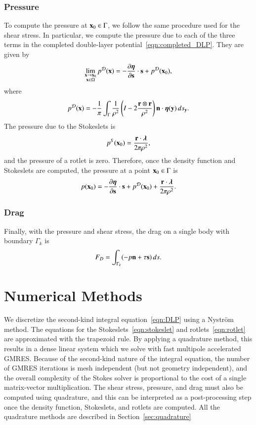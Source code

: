 \documentclass[preprint, 10pt]{elsarticle}
\begin{document}
\subsubsection{Pressure}
To compute the pressure at ${\mathbf{x}}_0 \in \Gamma$, we follow the same
procedure used for the shear stress.  In particular, we compute the
pressure due to each of the three terms in the completed double-layer
potential~\eqref{eqn:completed_DLP}.  They are given by
\begin{align*}
  \lim_{\substack{{\mathbf{x}} \rightarrow {\mathbf{x}}_0 \\ {\mathbf{x}} \in \Omega}}p^{\mathcal{D}}({\mathbf{x}}) =  
  -\frac{\partial {\boldsymbol\eta}}{\partial {\mathbf{s}}} \cdot {\mathbf{s}} + p^{{\mathcal{D}}}({\mathbf{x}}_0),
\end{align*}
where
\begin{align*}
  p^{\mathcal{D}}({\mathbf{x}}) = -\frac{1}{\pi}\int_{\Gamma} \frac{1}{\rho^2}
    \left(I - 2 \frac{{\mathbf{r}} \otimes {\mathbf{r}}}{\rho^2}\right) 
    {\mathbf{n}} \cdot {\boldsymbol\eta}({\mathbf{y}}) \,ds_{\mathbf{y}}.
\end{align*}
The pressure due to the Stokeslets is
\begin{align}
  p^S({\mathbf{x}}_0) = \frac{{\mathbf{r}} \cdot {\boldsymbol\lambda}}{2\pi\rho^2},
  \label{eqn:pressureDLP}
\end{align}
and the pressure of a rotlet is zero.  Therefore, once the density
function and Stokeslets are computed, the pressure at a point ${\mathbf{x}}_0 \in
\Gamma$ is
\begin{align*}
  p({\mathbf{x}}_0) = -\frac{\partial {\boldsymbol\eta}}{\partial {\mathbf{s}}} \cdot {\mathbf{s}} + p^{{\mathcal{D}}}({\mathbf{x}}_0) + 
              \frac{{\mathbf{r}} \cdot {\boldsymbol\lambda}}{2\pi\rho^2}.
\end{align*}

\subsubsection{Drag}
Finally, with the pressure and shear stress, the drag on a single body
with boundary $\Gamma_k$ is
\begin{align*}
  F_D = \int_{\Gamma_k} (-p {\mathbf{n}} + \tau {\mathbf{s}})\,ds.
\end{align*}


\section{Numerical Methods\label{s:method}} 
We discretize the second-kind integral equation~\eqref{eqn:DLP} using a
Nystr\"om method.  The equations for the
Stokeslets~\eqref{eqn:stokeslet} and rotlets~\eqref{eqn:rotlet} are
approximated with the trapezoid rule.  By applying a quadrature method,
this results in a dense linear system which we solve with fast multipole
accelerated GMRES.  Because of the second-kind nature of the integral
equation, the number of GMRES iterations is mesh independent (but not
geometry independent), and the overall complexity of the Stokes solver
is proportional to the cost of a single matrix-vector multiplication.
The shear stress, pressure, and drag must also be computed using
quadrature, and this can be interpreted as a post-processing step once
the density function, Stokeslets, and rotlets are computed.  All the
quadrature methods are described in Section~\ref{sec:quadrature}
\end{document}
